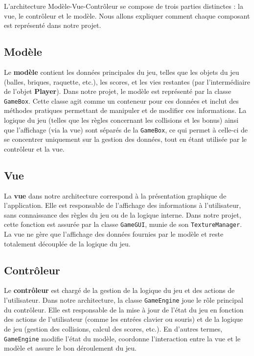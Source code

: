 \documentclass{article}
\begin{document}
\noindent L'architecture Modèle-Vue-Contrôleur se compose de trois parties distinctes : la vue, le contrôleur et le modèle. Nous allons expliquer comment chaque composant est représenté dans notre projet.

\subsection{Modèle}

\noindent Le \textbf{modèle} contient les données principales du jeu, telles que les objets du jeu (balles, briques, raquette, etc.), les scores, et les vies restantes (par l'intermédiaire de l'objet \textbf{Player}). Dans notre projet, le modèle est représenté par la classe \texttt{GameBox}. Cette classe agit comme un conteneur pour ces données et inclut des méthodes pratiques permettant de manipuler et de modifier ces informations. La logique du jeu (telles que les règles concernant les collisions et les bonus) ainsi que l'affichage (via la vue) sont séparés de la \texttt{GameBox}, ce qui permet à celle-ci de se concentrer uniquement sur la gestion des données, tout en étant utilisée par le contrôleur et la vue.

\subsection{Vue}

\noindent La \textbf{vue} dans notre architecture correspond à la présentation graphique de l'application. Elle est responsable de l'affichage des informations à l'utilisateur, sans connaissance des règles du jeu ou de la logique interne. Dans notre projet, cette fonction est assurée par la classe \texttt{GameGUI}, munie de son \texttt{TextureManager}. La vue ne gère que l'affichage des données fournies par le modèle et reste totalement découplée de la logique du jeu.

\subsection{Contrôleur}

\noindent Le \textbf{contrôleur} est chargé de la gestion de la logique du jeu et des actions de l'utilisateur. Dans notre architecture, la classe \texttt{GameEngine} joue le rôle principal du contrôleur. Elle est responsable de la mise à jour de l'état du jeu en fonction des actions de l'utilisateur (comme les entrées clavier ou souris) et de la logique de jeu (gestion des collisions, calcul des scores, etc.). En d'autres termes, \texttt{GameEngine} modifie l'état du modèle, coordonne l'interaction entre la vue et le modèle et assure le bon déroulement du jeu.
\end{document}
